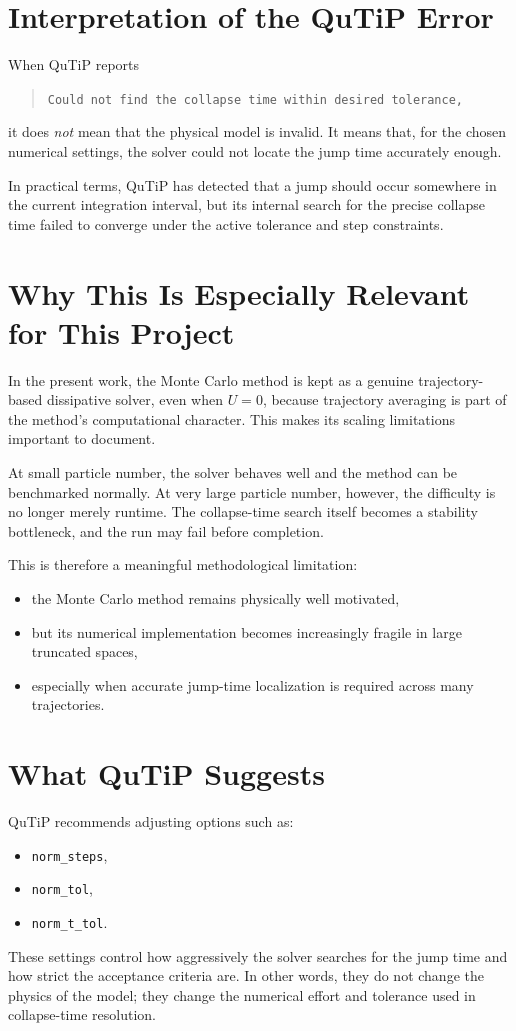 \documentclass[12pt]{article}
\begin{document}
\section*{Interpretation of the QuTiP Error}
When QuTiP reports
\begin{quote}
\texttt{Could not find the collapse time within desired tolerance,}
\end{quote}
it does \emph{not} mean that the physical model is invalid. It means that, for the chosen numerical settings, the solver could not locate the jump time accurately enough.

In practical terms, QuTiP has detected that a jump should occur somewhere in the current integration interval, but its internal search for the precise collapse time failed to converge under the active tolerance and step constraints.

\section*{Why This Is Especially Relevant for This Project}
In the present work, the Monte Carlo method is kept as a genuine trajectory-based dissipative solver, even when $U=0$, because trajectory averaging is part of the method's computational character. This makes its scaling limitations important to document.

At small particle number, the solver behaves well and the method can be benchmarked normally. At very large particle number, however, the difficulty is no longer merely runtime. The collapse-time search itself becomes a stability bottleneck, and the run may fail before completion.

This is therefore a meaningful methodological limitation:
\begin{itemize}
\item the Monte Carlo method remains physically well motivated,
\item but its numerical implementation becomes increasingly fragile in large truncated spaces,
\item especially when accurate jump-time localization is required across many trajectories.
\end{itemize}

\section*{What QuTiP Suggests}
QuTiP recommends adjusting options such as:
\begin{itemize}
\item \texttt{norm\_steps},
\item \texttt{norm\_tol},
\item \texttt{norm\_t\_tol}.
\end{itemize}
These settings control how aggressively the solver searches for the jump time and how strict the acceptance criteria are. In other words, they do not change the physics of the model; they change the numerical effort and tolerance used in collapse-time resolution.
\end{document}
